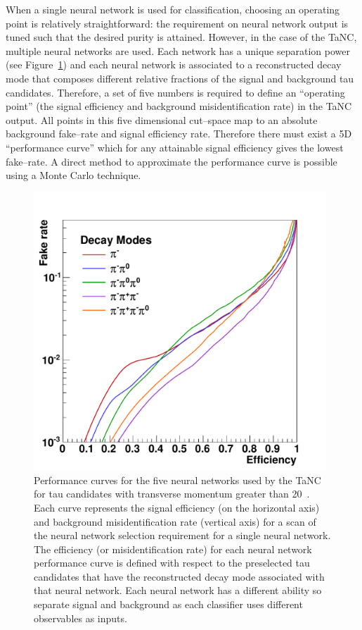 When a single neural network is used for classification, choosing an operating
point is relatively straightforward: the requirement on neural
network output is tuned such that the desired purity is attained.  However, in the case
of the TaNC, multiple neural networks are used.  Each network has a unique
separation power (see Figure~\ref{fig:nnPerfCurves}) and each neural network is
associated to a reconstructed decay mode that composes different relative
fractions of the signal and background tau candidates.  Therefore, a set of five
numbers is required to define an ``operating point'' (the signal efficiency and
background misidentification rate) in the TaNC output.  All points in this five
dimensional cut--space map to an absolute background fake--rate and signal
efficiency rate.  Therefore there must exist a 5D ``performance curve'' which
for any attainable signal efficiency gives the lowest fake--rate.  A direct
method to approximate the performance curve is possible using a Monte Carlo
technique.   
%
\begin{figure}[thbp]
   \setlength{\unitlength}{1mm}
   \begin{center}
     \includegraphics[width=0.98\textwidth]{tanc_chapter/figures/nnPerfCurves_20.pdf}
   \caption[Performance curves for the neural networks used in the
   TaNC]{Performance curves for the five neural networks used by the TaNC for
   tau candidates with transverse momentum greater than 20~\GeVc.  Each curve
   represents the signal efficiency (on the horizontal axis) and background
   misidentification rate (vertical axis) for a scan of the neural network
   selection requirement for a single neural network.  The efficiency (or
   misidentification rate) for each neural network performance curve is defined
   with respect to the preselected tau candidates that have the reconstructed
   decay mode associated with that neural network.  Each neural network has a
   different ability so separate signal and background as each classifier uses
   different observables as inputs.  } \label{fig:nnPerfCurves}
   \end{center}
\end{figure}


